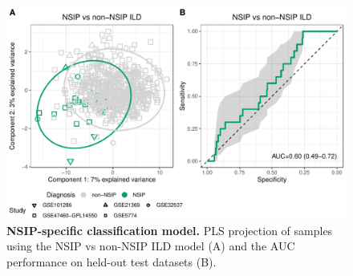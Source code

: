 \documentclass[
]{article}
\begin{document}
\pagebreak

\newpage



\begin{figure}

{\centering \includegraphics[width=0.9\linewidth,]{./Figures/SysReview/FigE5_NSIP} 

}

\caption[Model tuning]{\textbf{NSIP-specific classification model.} PLS projection of samples using the NSIP vs non-NSIP ILD model (A) and the AUC performance on held-out test datasets (B).}\label{fig:nsipmodel}
\end{figure}
\end{document}
